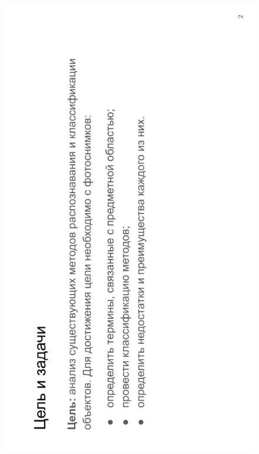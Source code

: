 \begin{figure}[H]
	\begin{center}
		\includegraphics[scale=0.7]{inc/img/slide2.png}
	\end{center}
\end{figure}

